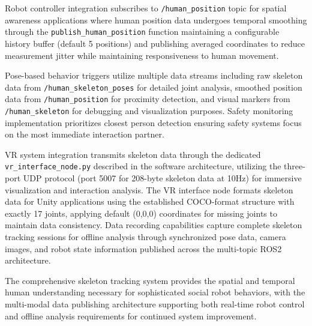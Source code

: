 Robot controller integration subscribes to \texttt{/human\_position} topic for spatial awareness applications where human position data undergoes temporal smoothing through the \texttt{publish\_human\_position} function maintaining a configurable history buffer (default 5 positions) and publishing averaged coordinates to reduce measurement jitter while maintaining responsiveness to human movement.

Pose-based behavior triggers utilize multiple data streams including raw skeleton data from \texttt{/human\_skeleton\_poses} for detailed joint analysis, smoothed position data from \texttt{/human\_position} for proximity detection, and visual markers from \texttt{/human\_skeleton} for debugging and visualization purposes. Safety monitoring implementation prioritizes closest person detection ensuring safety systems focus on the most immediate interaction partner.

VR system integration transmits skeleton data through the dedicated \texttt{vr\_interface\_node.py} described in the software architecture, utilizing the three-port UDP protocol (port 5007 for 208-byte skeleton data at 10Hz) for immersive visualization and interaction analysis. The VR interface node formats skeleton data for Unity applications using the established COCO-format structure with exactly 17 joints, applying default (0,0,0) coordinates for missing joints to maintain data consistency. Data recording capabilities capture complete skeleton tracking sessions for offline analysis through synchronized pose data, camera images, and robot state information published across the multi-topic ROS2 architecture.

The comprehensive skeleton tracking system provides the spatial and temporal human understanding necessary for sophisticated social robot behaviors, with the multi-modal data publishing architecture supporting both real-time robot control and offline analysis requirements for continued system improvement.


